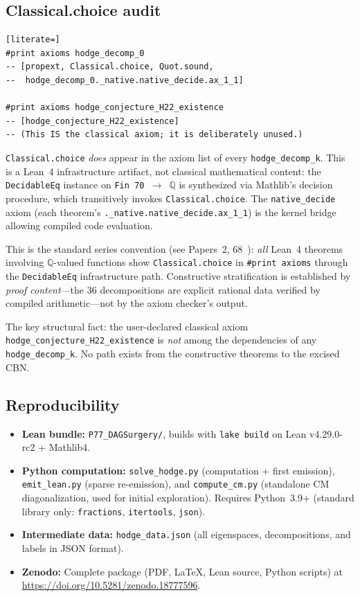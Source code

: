 \documentclass[11pt]{article}
\theoremstyle{plain}
\theoremstyle{definition}
\theoremstyle{remark}
\newcommand{\Q}{\mathbb{Q}}
\begin{document}
\subsection{Classical.choice audit}\label{sec:choice-audit}

\begin{lstlisting}[literate=]
#print axioms hodge_decomp_0
-- [propext, Classical.choice, Quot.sound,
--  hodge_decomp_0._native.native_decide.ax_1_1]

#print axioms hodge_conjecture_H22_existence
-- [hodge_conjecture_H22_existence]
-- (This IS the classical axiom; it is deliberately unused.)
\end{lstlisting}

\noindent
\texttt{Classical.choice} \emph{does} appear in the axiom list
of every \texttt{hodge\_decomp\_k}.  This is a Lean~4 infrastructure
artifact, not classical mathematical content: the
\texttt{DecidableEq} instance on \texttt{Fin~70~$\to$~$\Q$} is
synthesized via Mathlib's decision procedure, which transitively
invokes \texttt{Classical.choice}.  The \texttt{native\_decide}
axiom (each theorem's \texttt{.\_native.native\_decide.ax\_1\_1})
is the kernel bridge allowing compiled code evaluation.

This is the standard series convention (see Papers~2, 68~\cite{Paper68}):
\emph{all} Lean~4 theorems involving $\Q$-valued functions show
\texttt{Classical.choice} in \texttt{\#print axioms} through the
\texttt{DecidableEq} infrastructure path.  Constructive
stratification is established by \emph{proof content}---the 36
decompositions are explicit rational data verified by compiled
arithmetic---not by the axiom checker's output.

The key structural fact: the user-declared classical axiom
\texttt{hodge\_conjecture\_H22\_existence} is \emph{not} among the
dependencies of any \texttt{hodge\_decomp\_k}.  No path exists
from the constructive theorems to the excised CBN.

\subsection{Reproducibility}

\begin{itemize}[nosep]
\item \textbf{Lean bundle:} \texttt{P77\_DAGSurgery/},
  builds with \texttt{lake build} on Lean v4.29.0-rc2 + Mathlib4.
\item \textbf{Python computation:} \texttt{solve\_hodge.py}
  (computation + first emission), \texttt{emit\_lean.py}
  (sparse re-emission), and \texttt{compute\_cm.py}
  (standalone CM diagonalization, used for initial exploration).
  Requires Python~3.9+ (standard library
  only: \texttt{fractions}, \texttt{itertools}, \texttt{json}).
\item \textbf{Intermediate data:} \texttt{hodge\_data.json}
  (all eigenspaces, decompositions, and labels in JSON format).
\item \textbf{Zenodo:} Complete package (PDF, LaTeX, Lean source,
  Python scripts) at
  \url{https://doi.org/10.5281/zenodo.18777596}.
\end{itemize}
\end{document}
